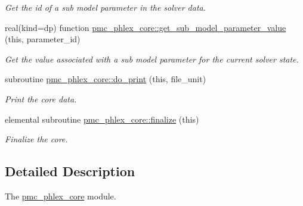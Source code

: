 \begin{DoxyCompactItemize}
\begin{DoxyCompactList}\small\item\em Get the id of a sub model parameter in the solver data. \end{DoxyCompactList}\item 
real(kind=dp) function \mbox{\hyperlink{namespacepmc__phlex__core_ae94feceace9210cc12293628842f9a7e}{pmc\+\_\+phlex\+\_\+core\+::get\+\_\+sub\+\_\+model\+\_\+parameter\+\_\+value}} (this, parameter\+\_\+id)
\begin{DoxyCompactList}\small\item\em Get the value associated with a sub model parameter for the current solver state. \end{DoxyCompactList}\item 
subroutine \mbox{\hyperlink{namespacepmc__phlex__core_a06f496bd886df92d34a981c082eecdb3}{pmc\+\_\+phlex\+\_\+core\+::do\+\_\+print}} (this, file\+\_\+unit)
\begin{DoxyCompactList}\small\item\em Print the core data. \end{DoxyCompactList}\item 
elemental subroutine \mbox{\hyperlink{namespacepmc__phlex__core_adc400294fd57d72328a0914e31dd3836}{pmc\+\_\+phlex\+\_\+core\+::finalize}} (this)
\begin{DoxyCompactList}\small\item\em Finalize the core. \end{DoxyCompactList}\end{DoxyCompactItemize}


\subsection{Detailed Description}
The \mbox{\hyperlink{namespacepmc__phlex__core}{pmc\+\_\+phlex\+\_\+core}} module. 


